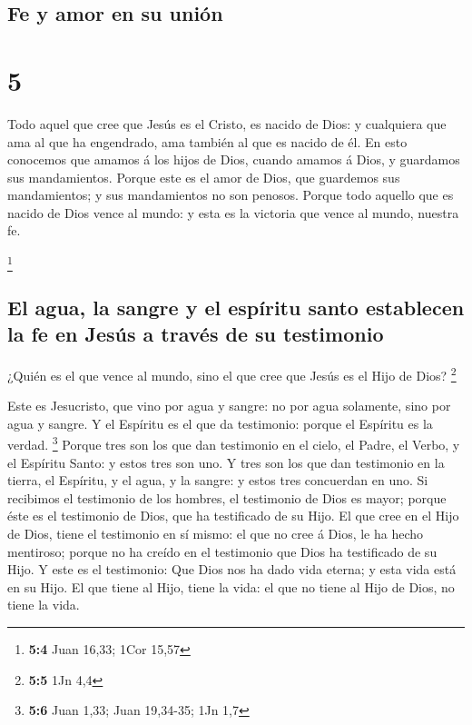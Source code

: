 \hypertarget{fe-y-amor-en-su-uniuxf3n}{%
\subsection{Fe y amor en su unión}\label{fe-y-amor-en-su-uniuxf3n}}

\hypertarget{section-4}{%
\section{5}\label{section-4}}

 Todo aquel que cree que Jesús es el Cristo, es nacido de
Dios: y cualquiera que ama al que ha engendrado, ama también al que es
nacido de él.  En esto conocemos que amamos á los hijos de
Dios, cuando amamos á Dios, y guardamos sus mandamientos. 
Porque este es el amor de Dios, que guardemos sus mandamientos; y sus
mandamientos no son penosos.  Porque todo aquello que es
nacido de Dios vence al mundo: y esta es la victoria que vence al mundo,
nuestra fe.

\footnote{\textbf{5:4} Juan 16,33; 1Cor 15,57}

\hypertarget{el-agua-la-sangre-y-el-espuxedritu-santo-establecen-la-fe-en-jesuxfas-a-travuxe9s-de-su-testimonio}{%
\subsection{El agua, la sangre y el espíritu santo establecen la fe en
Jesús a través de su
testimonio}\label{el-agua-la-sangre-y-el-espuxedritu-santo-establecen-la-fe-en-jesuxfas-a-travuxe9s-de-su-testimonio}}

 ¿Quién es el que vence al mundo, sino el que cree que Jesús
es el Hijo de Dios? \footnote{\textbf{5:5} 1Jn 4,4}

 Este es Jesucristo, que vino por agua y sangre: no por agua
solamente, sino por agua y sangre. Y el Espíritu es el que da
testimonio: porque el Espíritu es la verdad. \footnote{\textbf{5:6} Juan
  1,33; Juan 19,34-35; 1Jn 1,7}  Porque tres son los que dan
testimonio en el cielo, el Padre, el Verbo, y el Espíritu Santo: y estos
tres son uno.  Y tres son los que dan testimonio en la
tierra, el Espíritu, y el agua, y la sangre: y estos tres concuerdan en
uno.  Si recibimos el testimonio de los hombres, el
testimonio de Dios es mayor; porque éste es el testimonio de Dios, que
ha testificado de su Hijo.  El que cree en el Hijo de Dios,
tiene el testimonio en sí mismo: el que no cree á Dios, le ha hecho
mentiroso; porque no ha creído en el testimonio que Dios ha testificado
de su Hijo.  Y este es el testimonio: Que Dios nos ha dado
vida eterna; y esta vida está en su Hijo.  El que tiene al
Hijo, tiene la vida: el que no tiene al Hijo de Dios, no tiene la vida.

